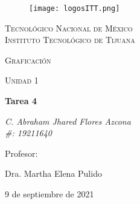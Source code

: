 \documentclass[a4paper, 12pt]{article}
\begin{document}
    
    \begin{titlepage}
        \begin{figure}[ht]
            \centering
            \texttt{[image: logosITT.png]}
        \end{figure}
        \centering
        {\scshape\LARGE Tecnológico Nacional de México\\Instituto Tecnológico de Tijuana\par}
        \vspace{2cm}
        {\scshape\Large Graficación\par}
        \vspace{2cm}
        {\scshape\Large Unidad 1\par}
        \vspace{3cm}
        {\huge\bfseries Tarea 4\par}
        \vspace{4cm}
        {\Large\itshape C. Abraham Jhared Flores Azcona\\\#: 19211640\par}
        \vfill
        Profesor: \par
        Dra. Martha Elena Pulido
        
        \vfill

        {\large 9 de septiembre de 2021}
    \end{titlepage}
\end{document}
